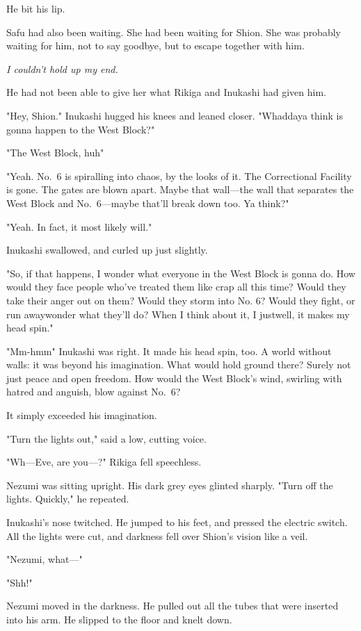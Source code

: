 He bit his lip.

Safu had also been waiting. She had been waiting for Shion. She was
probably waiting for him, not to say goodbye, but to escape together
with him.

\emph{I couldn't hold up my end.}

He had not been able to give her what Rikiga and Inukashi had given him.

"Hey, Shion." Inukashi hugged his knees and leaned closer. "Whaddaya
think is gonna happen to the West Block?"

"The West Block, huh\el "

"Yeah. No.~6 is spiralling into chaos, by the looks of it. The
Correctional Facility is gone. The gates are blown apart. Maybe that
wall---the wall that separates the West Block and No.~6---maybe that'll
break down too. Ya think?"

"Yeah. In fact, it most likely will."

Inukashi swallowed, and curled up just slightly.

"So, if that happens, I wonder what everyone in the West Block is gonna
do. How would they face people who've treated them like crap all this
time? Would they take their anger out on them? Would they storm into No.
6? Would they fight, or run away\el wonder what they'll do? When I think
about it, I just\el well, it makes my head spin."

"Mm-hmm\el " Inukashi was right. It made his head spin, too. A world
without walls: it was beyond his imagination. What would hold ground
there? Surely not just peace and open freedom. How would the West
Block's wind, swirling with hatred and anguish, blow against No.~6?

It simply exceeded his imagination.

"Turn the lights out," said a low, cutting voice.

"Wh---Eve, are you---?" Rikiga fell speechless.

Nezumi was sitting upright. His dark grey eyes glinted sharply. "Turn
off the lights. Quickly," he repeated.

Inukashi's nose twitched. He jumped to his feet, and pressed the
electric switch. All the lights were cut, and darkness fell over Shion's
vision like a veil.

"Nezumi, what---"

"Shh!"

Nezumi moved in the darkness. He pulled out all the tubes that were
inserted into his arm. He slipped to the floor and knelt down.

